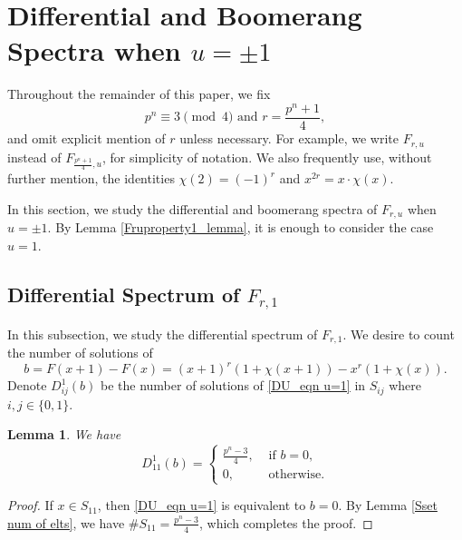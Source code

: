 \documentclass[11pt]{article}
\numberwithin{theorem}{section}
\newtheorem{lemma}[theorem]{Lemma}
\begin{document}
\section{Differential and Boomerang Spectra when $u = \pm 1$}\label{sec u=pm1}

Throughout the remainder of this paper, we fix 
\begin{equation*}
	p^n\equiv 3\pmod{4}\text{ and }r=\frac{p^n+1}{4},
\end{equation*}
and omit explicit mention of $r$ unless necessary. For example, we write $F_{r,u}$ instead of $F_{\frac{p^n+1}{4},u}$, for simplicity of notation. We also frequently use, without further mention, the identities $\chi(2) = (-1)^r$ and $x^{2r}=x\cdot \chi(x)$. 

In this section, we study the differential and boomerang spectra of $F_{r,u}$ when $u=\pm 1$. By Lemma \ref{Fruproperty1_lemma}, it is enough to consider the case $u=1$. 




\subsection{Differential Spectrum of $F_{r,1}$}\label{subsec DS}

In this subsection, we study the differential spectrum of $F_{r,1}$. We desire to count the number of solutions of 
\begin{equation}\label{DU_eqn u=1}
	b=F(x+1)-F(x) = (x+1)^r(1+\chi(x+1))-x^r(1+\chi(x)).
\end{equation}
Denote $D_{ij}^1(b)$ be the number of solutions of \eqref{DU_eqn u=1} in $S_{ij}$ where $i,j\in\{0,1\}$. 

\begin{lemma}\label{DU_lemma u=1 S11}
	We have 
	\begin{equation*}
		D_{11}^1(b)=
		\begin{cases}
			\frac{p^n-3}{4}, &\text{ if }b=0,\\
			0, &\text{ otherwise.}
		\end{cases}
	\end{equation*}
\end{lemma}

\begin{proof}
	If $x\in S_{11}$, then \eqref{DU_eqn u=1} is equivalent to $b=0$.
	By Lemma \ref{Sset num of elts}, we have $\#S_{11}=\frac{p^n-3}{4}$, which completes the proof.
\end{proof}
\end{document}
